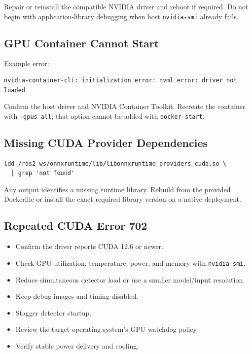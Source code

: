 \documentclass[11pt,a4paper]{article}
\begin{document}
Repair or reinstall the compatible NVIDIA driver and reboot if required. Do not begin with application-library debugging when host \texttt{nvidia-smi} already fails.

\subsection{GPU Container Cannot Start}

Example error:

\begin{lstlisting}
nvidia-container-cli: initialization error: nvml error: driver not loaded
\end{lstlisting}

Confirm the host driver and NVIDIA Container Toolkit. Recreate the container with \texttt{--gpus all}; that option cannot be added with \texttt{docker start}.

\subsection{Missing CUDA Provider Dependencies}

\begin{lstlisting}
ldd /ros2_ws/onnxruntime/lib/libonnxruntime_providers_cuda.so \
  | grep 'not found'
\end{lstlisting}

Any output identifies a missing runtime library. Rebuild from the provided Dockerfile or install the exact required library version on a native deployment.

\subsection{Repeated CUDA Error 702}

\begin{itemize}
  \item Confirm the driver reports CUDA 12.6 or newer.
  \item Check GPU utilization, temperature, power, and memory with \texttt{nvidia-smi}.
  \item Reduce simultaneous detector load or use a smaller model/input resolution.
  \item Keep debug images and timing disabled.
  \item Stagger detector startup.
  \item Review the target operating system's GPU watchdog policy.
  \item Verify stable power delivery and cooling.
\end{itemize}
\end{document}

